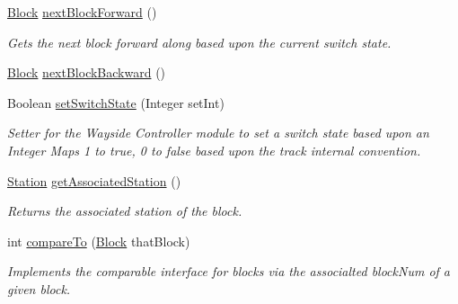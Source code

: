 \begin{DoxyCompactItemize}
\hyperlink{classTrackModel_1_1Block}{Block} \hyperlink{classTrackModel_1_1Block_a5b41d49bee482917bbc5d3af78c25020}{next\+Block\+Forward} ()
\begin{DoxyCompactList}\small\item\em Gets the next block forward along based upon the current switch state. \end{DoxyCompactList}\item 
\hyperlink{classTrackModel_1_1Block}{Block} \hyperlink{classTrackModel_1_1Block_a0ea37da4be949e0734cd7c6db555013e}{next\+Block\+Backward} ()
\item 
Boolean \hyperlink{classTrackModel_1_1Block_aa206833e61700249e5905fe6e6126399}{set\+Switch\+State} (Integer set\+Int)
\begin{DoxyCompactList}\small\item\em Setter for the Wayside Controller module to set a switch state based upon an Integer Maps 1 to true, 0 to false based upon the track internal convention. \end{DoxyCompactList}\item 
\hyperlink{classTrackModel_1_1Station}{Station} \hyperlink{classTrackModel_1_1Block_ad01125a6c501452bf33320b01471a24a}{get\+Associated\+Station} ()
\begin{DoxyCompactList}\small\item\em Returns the associated station of the block. \end{DoxyCompactList}\item 
int \hyperlink{classTrackModel_1_1Block_a2b940992804680c1146a1fef8f55f7db}{compare\+To} (\hyperlink{classTrackModel_1_1Block}{Block} that\+Block)
\begin{DoxyCompactList}\small\item\em Implements the comparable interface for blocks via the associalted block\+Num of a given block. \end{DoxyCompactList}\end{DoxyCompactItemize}
